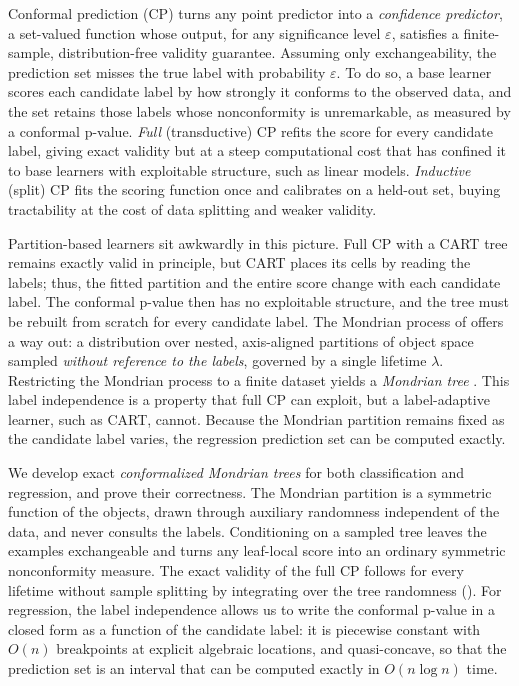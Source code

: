 \documentclass[twoside]{article}
\numberwithin{equation}{section}
\theoremstyle{plain}
\theoremstyle{definition}
\theoremstyle{remark}
\begin{document}
    Conformal prediction (CP) \citep{alrw2} turns any point predictor into a \emph{confidence predictor}, a set-valued function whose output, for any significance level $\varepsilon$, satisfies a finite-sample, distribution-free validity guarantee. Assuming only exchangeability, the prediction set misses the true label with probability $\varepsilon$. To do so, a base learner scores each candidate label by how strongly it conforms to the observed data, and the set retains those labels whose nonconformity is unremarkable, as measured by a conformal p-value. \emph{Full} (transductive) CP refits the score for every candidate label, giving exact validity but at a steep computational cost that has confined it to base learners with exploitable structure, such as linear models. \emph{Inductive} (split) CP fits the scoring function once and calibrates on a held-out set, buying tractability at the cost of data splitting and weaker validity.

    Partition-based learners sit awkwardly in this picture. Full CP with a CART tree \citep{breiman1984classification} remains exactly valid in principle, but CART places its cells by reading the labels; thus, the fitted partition and the entire score change with each candidate label. The conformal p-value then has no exploitable structure, and the tree must be rebuilt from scratch for every candidate label. The Mondrian process of \citet{roy2009mondrian} offers a way out: a distribution over nested, axis-aligned partitions of object space sampled \emph{without reference to the labels}, governed by a single lifetime $\lambda$. Restricting the Mondrian process to a finite dataset yields a \emph{Mondrian tree} \citep{lakshminarayanan2014mondrian}. This label independence is a property that full CP can exploit, but a label-adaptive learner, such as CART, cannot. Because the Mondrian partition remains fixed as the candidate label varies, the regression prediction set can be computed exactly.

    We develop exact \emph{conformalized Mondrian trees} for both classification and regression, and prove their correctness. The Mondrian partition is a symmetric function of the objects, drawn through auxiliary randomness independent of the data, and never consults the labels. Conditioning on a sampled tree leaves the examples exchangeable and turns any leaf-local score into an ordinary symmetric nonconformity measure. The exact validity of the full CP follows for every lifetime without sample splitting by integrating over the tree randomness (). For regression, the label independence allows us to write the conformal p-value in a closed form as a function of the candidate label: it is piecewise constant with $O(n)$ breakpoints at explicit algebraic locations, and quasi-concave, so that the prediction set is an interval that can be computed exactly in $O(n\log n)$ time.
\end{document}
